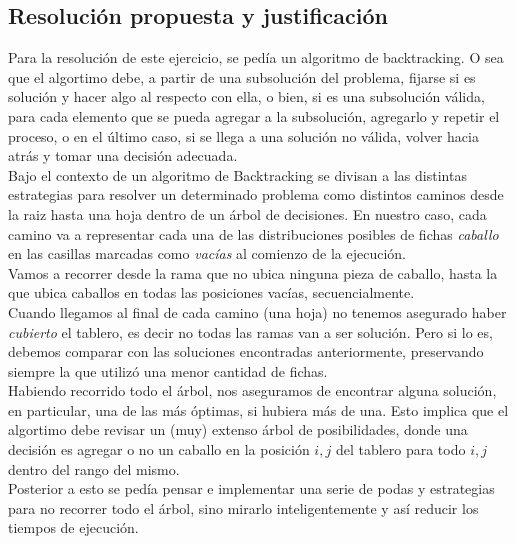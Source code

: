 \newpage

\subsection{Resoluci\'on propuesta y justificaci\'on}
Para la resoluci\'on de este ejercicio, se ped\'ia un algoritmo de backtracking. O sea que el algortimo debe, a partir de una subsoluci\'on del problema, fijarse si es soluci\'on y hacer algo  al respecto con ella, o bien, si es una subsoluci\'on v\'alida, para cada elemento que se pueda agregar a la subsoluci\'on, agregarlo y repetir el proceso, o en el \'ultimo caso, si se llega a una soluci\'on no v\'alida, volver hacia atr\'as y tomar una decisi\'on adecuada.\\

Bajo el contexto de un algoritmo de Backtracking se divisan a las distintas estrategias para resolver un determinado problema como distintos caminos desde la raiz hasta una hoja dentro de un \'arbol de decisiones. En nuestro caso, cada camino va a representar cada una de las distribuciones posibles de fichas \emph{caballo} en las casillas marcadas como \emph{vac\'ias} al comienzo de la ejecuci\'on.\\

Vamos a recorrer desde la rama que no ubica ninguna pieza de caballo, hasta la que ubica caballos en todas las posiciones vac\'ias, secuencialmente.\\

Cuando llegamos al final de cada camino (una hoja) no tenemos asegurado haber \emph{cubierto} el tablero, es decir no todas las ramas van a ser soluci\'on. Pero si lo es, debemos comparar con las soluciones encontradas anteriormente, preservando siempre la que utiliz\'o una menor cantidad de fichas.\\

Habiendo recorrido todo el \'arbol, nos aseguramos de encontrar alguna soluci\'on, en particular, una de las m\'as \'optimas, si hubiera m\'as de una. Esto implica que el algortimo debe revisar un (muy) extenso \'arbol de posibilidades, donde una decisi\'on es agregar o no un caballo en la posici\'on $i, j$ del tablero para todo $i, j$ dentro del rango del mismo. \\

Posterior a esto se ped\'ia pensar e implementar una serie de podas y estrategias para no recorrer todo el \'arbol, sino mirarlo inteligentemente y as\'i reducir los tiempos de ejecuci\'on.\\

